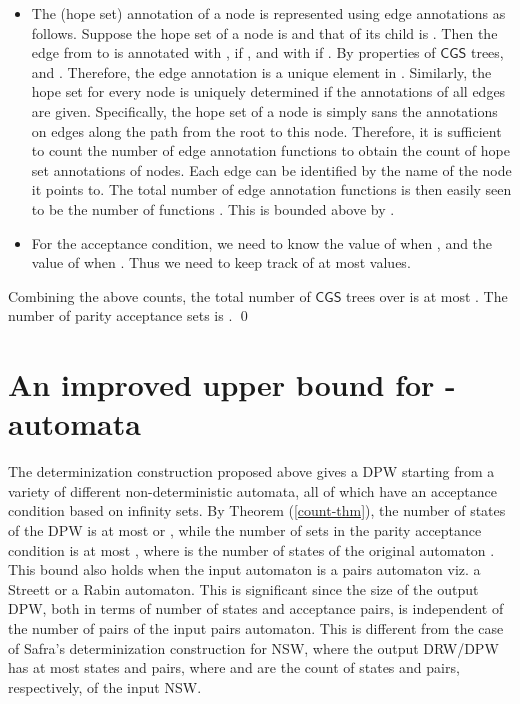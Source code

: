 \documentclass[3p]{elsarticle}
\newcommand{\CGS}{\ensuremath{\textsf{CGS }}}
\begin{document}
\begin{itemize}
\item The (hope set) annotation of a node is represented using edge
  annotations as follows. Suppose the hope set of a node  is 
  and that of its child  is .  Then the edge from  to
   is annotated with , if , and with  if .  By properties of \CGS trees,
   and .
  Therefore, the edge annotation is a unique element in .  Similarly, the hope set for every node is uniquely
  determined if the annotations of all edges are given.  Specifically,
  the hope set of a node is simply  sans the annotations on edges
  along the path from the root to this node.  Therefore, it is
  sufficient to count the number of edge annotation functions to
  obtain the count of hope set annotations of nodes.  Each edge can be
  identified by the name of the node it points to.  The total number
  of edge annotation functions is then easily seen to be the number of
  functions .  This is bounded above by
  .

\item For the acceptance condition, we need to know the value of 
  when , and the value of  when . Thus we need to
  keep track of at most  values.
\end{itemize}

Combining the above counts, the total number of \CGS trees over 
is at most
.  
The number of parity acceptance sets is . \qed


\section{An improved upper bound for -automata}
\label{sec:large-acc-sets}

The determinization construction proposed above gives a DPW starting
from a variety of different non-deterministic automata, all of which
have an acceptance condition based on infinity sets.  By Theorem
(\ref{count-thm}), the number of states of the DPW is at most
 or , while the number of sets in the
parity acceptance condition is at most , where  is the
number of states of the original automaton .  This bound also
holds when the input automaton is a pairs automaton viz. a Streett or
a Rabin automaton. This is significant since the size of the output
DPW, both in terms of number of states and acceptance pairs, is
independent of the number of pairs of the input pairs automaton. This
is different from the case of Safra's determinization construction for
NSW\cite{safra06}\cite{2001automata}\cite{piterman}, where the output
DRW/DPW has at most  states and  pairs,
where  and  are the count of states and pairs, respectively, of
the input NSW.
\end{document}
